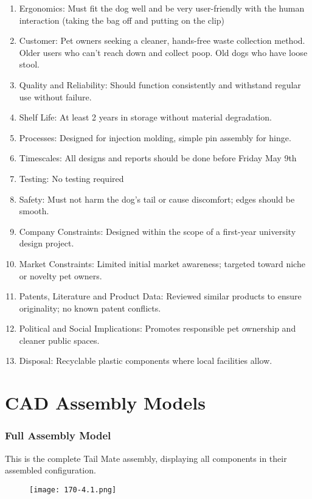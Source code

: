 \documentclass[12pt]{article}
\theoremstyle{definition} %
\theoremstyle{plain} %
\begin{document}
\begin{enumerate}
  \item Ergonomics: Must fit the dog well and be very user-friendly with the human
  interaction (taking the bag off and putting on the clip)
  \item Customer: Pet owners seeking a cleaner, hands-free waste collection
  method. Older users who can’t reach down and collect poop. Old dogs who
  have loose stool.
  \item Quality and Reliability: Should function consistently and withstand regular
  use without failure.
  \item Shelf Life: At least 2 years in storage without material degradation.
  \item Processes: Designed for injection molding, simple pin assembly for hinge.
  \item Timescales: All designs and reports should be done before Friday May 9th
  \item Testing: No testing required
  \item Safety: Must not harm the dog’s tail or cause discomfort; edges should be
  smooth.
  \item Company Constraints: Designed within the scope of a first-year university
  design project.
  \item Market Constraints: Limited initial market awareness; targeted toward niche
  or novelty pet owners.
  \item Patents, Literature and Product Data: Reviewed similar products to ensure
  originality; no known patent conflicts.
  \item Political and Social Implications: Promotes responsible pet ownership and
  cleaner public spaces.
  \item Disposal: Recyclable plastic components where local facilities allow. 
\end{enumerate}
\pagebreak

\section{CAD Assembly Models}
\subsubsection*{Full Assembly Model}
This is the complete Tail Mate assembly, displaying all components in their
assembled configuration.
\begin{figure}[htbp]
  \centering
  \texttt{[image: 170-4.1.png]}
  \caption{}
  \label{fig:}
\end{figure}
\end{document}
